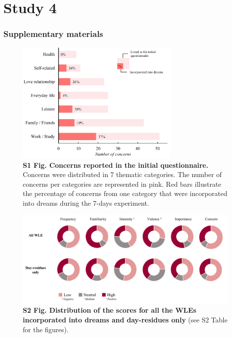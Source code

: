 \cleardoublepage

\chapter{Study 4}
\label{res:wle}

\cleardoublepage



\cleardoublepage

\subsection*{Supplementary materials}
\label{res:wle:supp}
\vspace*{1cm}

\begin{figure}[htbp]
	\includegraphics[width=0.72\textwidth]{Fig/Results/WLE/S1_Fig.png}
	\caption*{\textbf{S1 Fig. Concerns reported in the initial questionnaire.} Concerns were distributed in 7 thematic categories. The number of concerns per categories are represented in pink. Red bars illustrate the percentage of concerns from one category that were incorporated into dreams during the 7-days experiment.}
\end{figure}

\vspace*{3cm}

\begin{figure}[htbp]
	\includegraphics[width=\textwidth]{Fig/Results/WLE/S2_Fig.png}
	\caption*{\textbf{S2 Fig. Distribution of the scores for all the WLEs incorporated into dreams and day-residues only} (see S2 Table for the figures).}
\end{figure}

